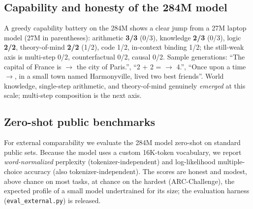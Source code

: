 \documentclass[11pt]{article}
\newcommand{\code}[1]{\texttt{#1}}
\begin{document}
\subsection{Capability and honesty of the 284M model}
A greedy capability battery on the 284M shows a clear jump from a 27M laptop model (27M in parentheses): arithmetic \textbf{3/3} (0/3), knowledge \textbf{2/3} (0/3), logic \textbf{2/2}, theory-of-mind \textbf{2/2} (1/2), code 1/2, in-context binding 1/2; the still-weak axis is multi-step 0/2, counterfactual 0/2, causal 0/2. Sample generations: ``The capital of France is $\to$ the city of Paris.'', ``2 + 2 = $\to$ 4.'', ``Once upon a time $\to$, in a small town named Harmonyville, lived two best friends''. World knowledge, single-step arithmetic, and theory-of-mind genuinely \emph{emerged} at this scale; multi-step composition is the next axis.

\smallskip\noindent{}\smallskip

\subsection{Zero-shot public benchmarks}
For external comparability we evaluate the 284M model zero-shot on standard public sets. Because the model uses a custom 16K-token vocabulary, we report \emph{word-normalized} perplexity (tokenizer-independent) and log-likelihood multiple-choice accuracy (also tokenizer-independent). The scores are honest and modest, above chance on most tasks, at chance on the hardest (ARC-Challenge), the expected profile of a small model undertrained for its size; the evaluation harness (\code{eval\_external.py}) is released.
\end{document}
